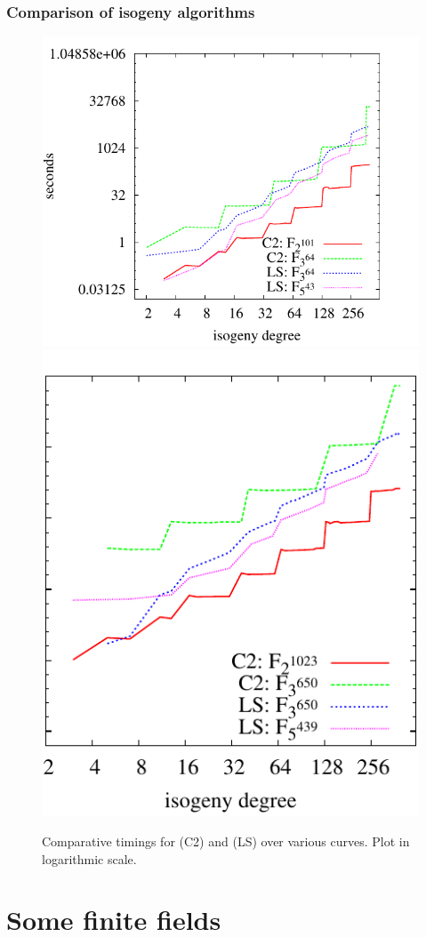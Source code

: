 \documentclass[10pt]{beamer}
\begin{document}
\begin{frame}
  \frametitle{Comparison of isogeny algorithms}
  
  \begin{figure}
    \centering
    \includegraphics[height=0.5\textwidth]{../isogeny/C2-LS}
    \includegraphics[height=0.5\textwidth]{../isogeny/C2-LS2}
    \caption{Comparative timings for \cite{couveignes96} (C2) and
      \cite{lercier+sirvent08} (LS) over various curves. Plot in
      logarithmic scale.}
  \label{fig:comp}
\end{figure}
\end{frame}


\section{Some finite fields}
\end{document}

